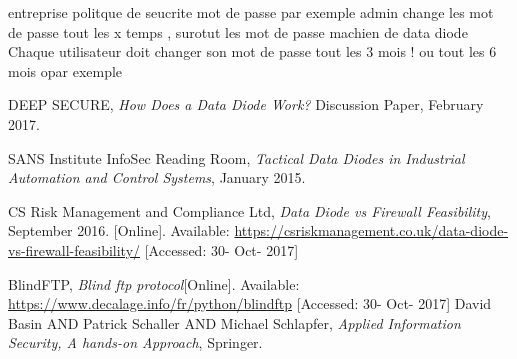 \documentclass[a4paper,10pt]{article}
\begin{document}
entreprise politque de seucrite mot de passe par exemple
 admin change les mot de passe tout les x temps , surotut les mot de passe machien de data diode
 Chaque utilisateur doit changer son mot de passe tout les 3 mois ! ou tout les 6 mois opar exemple
 
 
\clearpage
\begin{thebibliography}{9}
DEEP SECURE,
\textit{How	Does a Data Diode Work?}
Discussion Paper, February 2017.

SANS Institute InfoSec Reading Room,
\textit{Tactical Data Diodes in Industrial Automation and Control Systems}, January 2015.

CS Risk Management and Compliance Ltd,
\textit{Data Diode vs Firewall Feasibility}, September 2016. [Online]. Available: \url{https://csriskmanagement.co.uk/data-diode-vs-firewall-feasibility/} [Accessed: 30- Oct- 2017]

BlindFTP,
\textit{Blind ftp protocol}[Online]. Available: \url{https://www.decalage.info/fr/python/blindftp} [Accessed: 30- Oct- 2017]
David Basin AND Patrick Schaller AND Michael Schlapfer,
\textit{Applied Information Security, A hands-on Approach},
Springer.
\end{thebibliography}
\end{document}
